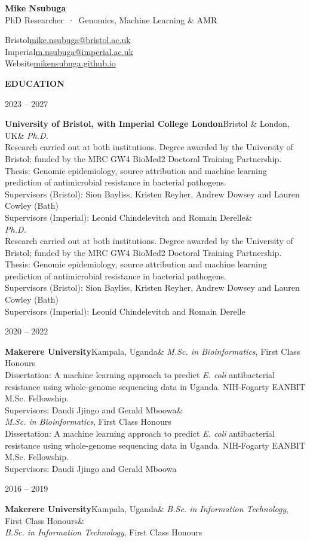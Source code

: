 \documentclass[10pt]{article}
\newlength{\datecol}\setlength{\datecol}{2.6cm}   %
\newlength{\sectiongap}\setlength{\sectiongap}{20pt}  %
\newlength{\headinggap}\setlength{\headinggap}{7pt}   %
\newlength{\entrygap}\setlength{\entrygap}{10pt}       %
\newlength{\titlegap}\setlength{\titlegap}{1pt}       %
\renewcommand{\section}[1]{%
  \par\addvspace{\sectiongap}%
  {\headfont\bfseries\color{accent}\addfontfeatures{LetterSpace=8}\MakeUppercase{#1}}%
  \hspace{0.6em}{\color{rulecol}\leaders\hrule height 0.5pt depth 0pt\hfill}\par\nopagebreak\addvspace{\headinggap}}
\newcommand{\entry}[4]{%
  \par\addvspace{\entrygap}%
  \noindent\parbox[t]{\datecol}{\raggedright\leavevmode\headfont\small\color{muted}#1}%
  \parbox[t]{\dimexpr\linewidth-\datecol\relax}{\raggedright\leavevmode
    \textbf{#2}\hfill{\small\color{muted}#3}\ifx&#4&\else\\[\titlegap]#4\fi}%
  \par\addvspace{\entrygap}}
\newcommand{\role}[1]{\textit{#1}}
\newcommand{\detail}[1]{{\small\color{muted}#1}}
\begin{document}
\begin{minipage}[b]{0.55\linewidth}
  {\headfont\fontsize{26}{30}\selectfont\bfseries Mike Nsubuga}\\[4pt]
  {\headfont\color{accent}PhD Researcher \,·\, Genomics, Machine Learning \& AMR}
\end{minipage}\hfill
\begin{minipage}[b]{0.44\linewidth}\raggedleft\small
  {\headfont\footnotesize\color{muted}Bristol}\enspace\href{mailto:mike.nsubuga@bristol.ac.uk}{mike.nsubuga@bristol.ac.uk}\\
  {\headfont\footnotesize\color{muted}Imperial}\enspace\href{mailto:m.nsubuga@imperial.ac.uk}{m.nsubuga@imperial.ac.uk}\\
  {\headfont\footnotesize\color{muted}Website}\enspace\href{https://mikensubuga.github.io/}{mikensubuga.github.io}
\end{minipage}
\par{}\vspace{2pt}

\section{Education}
\entry{2023 -- 2027}{University of Bristol, \textmd{with} Imperial College London}{Bristol \& London, UK}{%
  \role{Ph.D.}\\
  \detail{Research carried out at both institutions. Degree awarded by the University of Bristol; funded by the MRC GW4 BioMed2 Doctoral Training Partnership.}\\
  \detail{Thesis: Genomic epidemiology, source attribution and machine learning prediction of antimicrobial resistance in bacterial pathogens.}\\
  \detail{Supervisors (Bristol): Sion Bayliss, Kristen Reyher, Andrew Dowsey and Lauren Cowley (Bath)}\\
  \detail{Supervisors (Imperial): Leonid Chindelevitch and Romain Derelle}}
\entry{2020 -- 2022}{Makerere University}{Kampala, Uganda}{%
  \role{M.Sc. in Bioinformatics}, First Class Honours\\
  \detail{Dissertation: A machine learning approach to predict \textit{E. coli} antibacterial resistance using whole-genome sequencing data in Uganda. NIH-Fogarty EANBIT M.Sc. Fellowship.}\\
  \detail{Supervisors: Daudi Jjingo and Gerald Mboowa}}
\entry{2016 -- 2019}{Makerere University}{Kampala, Uganda}{%
  \role{B.Sc. in Information Technology}, First Class Honours}
\end{document}

